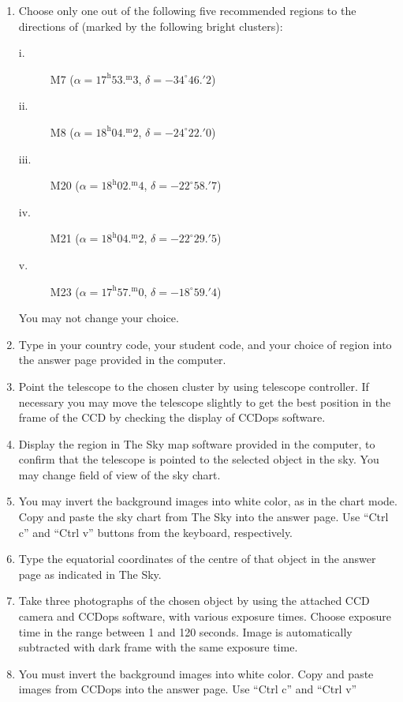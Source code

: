 \begin{enumerate}
\item Choose only one out of the following five recommended regions to the
  directions of (marked by the following bright clusters):
  \begin{description}
  \item[i.] M7 ($\alpha = 17^{\mathrm{h}}53.^{\mathrm{m}}3$,
    $\delta = -34^\circ 46.'2$)
  \item[ii.] M8 ($\alpha = 18^{\mathrm{h}}04.^{\mathrm{m}}2$,
    $\delta = -24^\circ 22.'0$)
  \item[iii.] M20 ($\alpha = 18^{\mathrm{h}}02.^{\mathrm{m}}4$,
    $\delta = -22^\circ 58.'7$)
  \item[iv.] M21 ($\alpha = 18^{\mathrm{h}}04.^{\mathrm{m}}2$,
    $\delta = -22^\circ 29.'5$)
  \item[v.] M23 ($\alpha = 17^{\mathrm{h}}57.^{\mathrm{m}}0$,
    $\delta = -18^\circ 59.'4$)
  \end{description}
  You may not change your choice.
\item Type in your country code, your student code, and your choice of
  region into the answer page provided in the computer.
\item Point the telescope to the chosen cluster by using telescope
  controller. If necessary you may move the telescope slightly to get the
  best position in the frame of the CCD by checking the display of CCDops
  software.
\item Display the region in The Sky map software provided in the computer,
  to confirm that the telescope is pointed to the selected object in the
  sky. You may change field of view of the sky chart.
\item You may invert the background images into white color, as in the chart
  mode. Copy and paste the sky chart from The Sky into the answer page. Use
  ``Ctrl c'' and ``Ctrl v'' buttons from the keyboard, respectively.
\item Type the equatorial coordinates of the centre of that object in the
  answer page as indicated in The Sky.
\item Take three photographs of the chosen object by using the attached CCD
  camera and CCDops software, with various exposure times. Choose exposure
  time in the range between 1 and 120 seconds. Image is automatically
  subtracted with dark frame with the same exposure time.
\item You must invert the background images into white color. Copy and paste
  images from CCDops into the answer page. Use ``Ctrl c'' and ``Ctrl v''

\end{enumerate}
